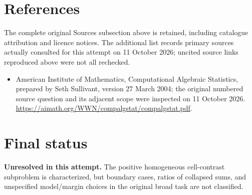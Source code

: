 \documentclass[11pt]{article}
\begin{document}
\section{References}
The complete original Sources subsection above is retained, including catalogue attribution and licence notices. The additional list records primary sources actually consulted for this attempt on 11 October 2026; uncited source links reproduced above were not all rechecked.
\begin{itemize}
\item American Institute of Mathematics, Computational Algebraic Statistics, prepared by Seth Sullivant, version 27 March 2004; the original numbered source question and its adjacent scope were inspected on 11 October 2026. \url{https://aimath.org/WWN/compalgstat/compalgstat.pdf}.
\end{itemize}
\section{Final status}
\textbf{Unresolved in this attempt.} The positive homogeneous cell-contrast subproblem is characterized, but boundary cases, ratios of collapsed sums, and unspecified model/margin choices in the original broad task are not classified.
\end{document}
